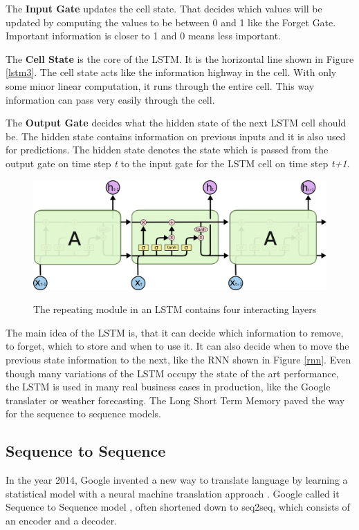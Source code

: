 The \textbf{Input Gate} updates the cell state. That decides which values will be updated by computing the values to be between 0 and 1 like the Forget Gate. Important information is closer to 1 and 0 means less important.

The \textbf{Cell State} is the core of the LSTM. It is the horizontal line shown in Figure \ref{lstm3}. The cell state acts like the information highway in the cell. With only some minor linear computation, it runs through the entire cell. This way information can pass very easily through the cell. 

The \textbf{Output Gate} decides what the hidden state of the next LSTM cell should be. The hidden state contains information on previous inputs and it is also used for predictions. The hidden state denotes the state which is passed from the output gate on time step \textit{t} to the input gate for the LSTM cell on time step \textit{t+1}.


\begin{figure}
	\begin{center}
		\includegraphics[width=4.5in]{photos/LSTM3-chain}\\
		\caption{The repeating module in an LSTM contains four interacting layers \cite{olah}}\label{lstm2}
	\end{center}
\end{figure}

The main idea of the LSTM is, that it can decide which information to remove, to forget, which to store and when to use it. It can also decide when to move the previous state information to the next, like the RNN shown in Figure \ref{rnn}. Even though many variations of the LSTM occupy the state of the art performance, the LSTM is used in many real business cases in production, like the Google translater or weather forecasting.
The Long Short Term Memory paved the way for the sequence to sequence models.

\subsection{Sequence to Sequence}\label{ss:seq2seq}
In the year 2014, Google invented a new way to translate language by learning a statistical model with a neural machine translation approach \cite{seq2seq}. Google called it Sequence to Sequence model \cite{seq2seq}, often shortened down to seq2seq, which consists of an encoder and a decoder. 

